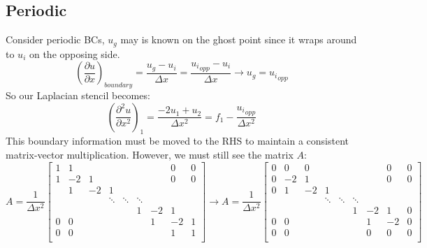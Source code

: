 \documentclass[landscape]{article}
\begin{document}
\subsection{Periodic}
Consider periodic BCs, $u_g$ may is known on the ghost point since it wraps around to $u_i$ on the opposing side.
\begin{equation}
  \left(\frac{\partial u}{\partial x}\right)_{boundary}
  = \frac{u_g - u_i}{\Delta x} = \frac{{u_i}_{opp} - u_i}{\Delta x}
  \rightarrow
  u_g = {u_i}_{opp}
\end{equation}
So our Laplacian stencil becomes:
\begin{equation}
   \left(\frac{\partial^2 u}{\partial x^2}\right)_{1} =
   \frac{- 2 u_1 + u_{2}}{\Delta x^2} = f_1 - \frac{{u_i}_{opp}}{\Delta x^2}
\end{equation}
This boundary information must be moved to the RHS to maintain a consistent matrix-vector multiplication. However, we must still see the matrix $A$:
\[ A = \frac{1}{\Delta x^2} \left[\begin{array}{ccccccccc}
1  & 1     &           &           &           &           &           & 0       &  0 \\
1  & -2    & 1         &           &           &           &           & 0       &  0 \\
   & 1     & -2        & 1         &           &           &           &         &    \\
   &       &           & \ddots    & \ddots    & \ddots    &           &         &    \\
   &       &           &           &           & 1         & -2        & 1       &    \\
0  & 0     &           &           &           &           &  1        & -2      &  1 \\
0  & 0     &           &           &           &           &           & 1       &  1 \\
\end{array} \right]
\rightarrow
A = \frac{1}{\Delta x^2} \left[\begin{array}{ccccccccc}
0  & 0     & 0         &           &           &           &           & 0       &  0 \\
0  & -2    & 1         &           &           &           &           & 0       &  0 \\
0  & 1     & -2        & 1         &           &           &           &         &    \\
   &       &           & \ddots    & \ddots    & \ddots    &           &         &    \\
   &       &           &           &           & 1         & -2        & 1       &  0 \\
0  & 0     &           &           &           &           &  1        & -2      &  0 \\
0  & 0     &           &           &           &           &  0        & 0       &  0 \\
\end{array} \right]
\]
\end{document}
